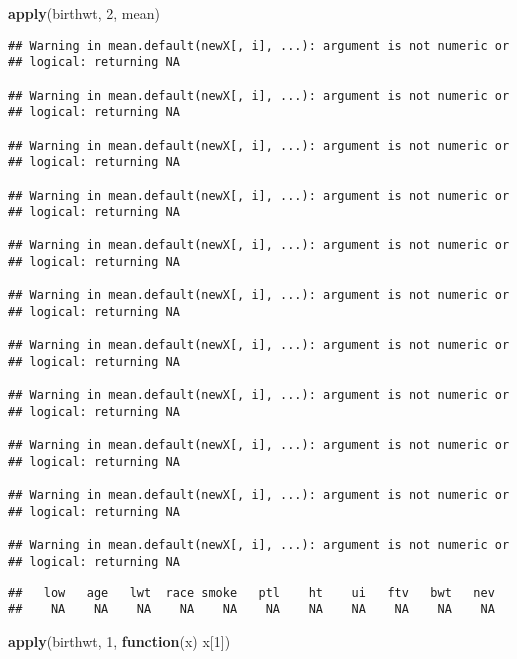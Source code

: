 \documentclass[]{book}
\newenvironment{Shaded}{\begin{snugshade}}{\end{snugshade}}
\newcommand{\KeywordTok}[1]{\textcolor[rgb]{0.13,0.29,0.53}{\textbf{#1}}}
\newcommand{\DecValTok}[1]{\textcolor[rgb]{0.00,0.00,0.81}{#1}}
\newcommand{\ControlFlowTok}[1]{\textcolor[rgb]{0.13,0.29,0.53}{\textbf{#1}}}
\newcommand{\NormalTok}[1]{#1}
\begin{document}
\begin{Shaded}
\begin{Highlighting}[]
\KeywordTok{apply}\NormalTok{(birthwt, }\DecValTok{2}\NormalTok{, mean)}
\end{Highlighting}
\end{Shaded}

\begin{verbatim}
## Warning in mean.default(newX[, i], ...): argument is not numeric or
## logical: returning NA

## Warning in mean.default(newX[, i], ...): argument is not numeric or
## logical: returning NA

## Warning in mean.default(newX[, i], ...): argument is not numeric or
## logical: returning NA

## Warning in mean.default(newX[, i], ...): argument is not numeric or
## logical: returning NA

## Warning in mean.default(newX[, i], ...): argument is not numeric or
## logical: returning NA

## Warning in mean.default(newX[, i], ...): argument is not numeric or
## logical: returning NA

## Warning in mean.default(newX[, i], ...): argument is not numeric or
## logical: returning NA

## Warning in mean.default(newX[, i], ...): argument is not numeric or
## logical: returning NA

## Warning in mean.default(newX[, i], ...): argument is not numeric or
## logical: returning NA

## Warning in mean.default(newX[, i], ...): argument is not numeric or
## logical: returning NA

## Warning in mean.default(newX[, i], ...): argument is not numeric or
## logical: returning NA
\end{verbatim}

\begin{verbatim}
##   low   age   lwt  race smoke   ptl    ht    ui   ftv   bwt   nev 
##    NA    NA    NA    NA    NA    NA    NA    NA    NA    NA    NA
\end{verbatim}

\begin{Shaded}
\begin{Highlighting}[]
\KeywordTok{apply}\NormalTok{(birthwt, }\DecValTok{1}\NormalTok{, }\ControlFlowTok{function}\NormalTok{(x) x[}\DecValTok{1}\NormalTok{])}
\end{Highlighting}
\end{Shaded}
\end{document}
